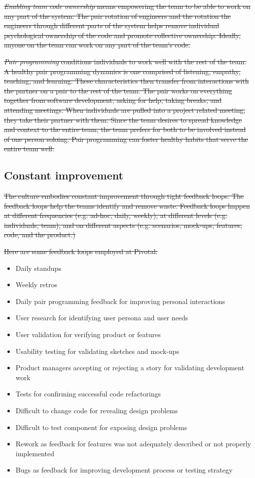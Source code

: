 \sout{\textit{Enabling team code ownership} means empowering the team to be able to work on any part of the system. The pair rotation of engineers and the rotation the engineers through different parts of the system helps remove individual psychological ownership of the code and promote collective ownership. Ideally, anyone on the team can work on any part of the team's code.}


\sout{\textit{Pair programming} conditions individuals to work well with the rest of the team. A healthy pair programming dynamics is one comprised of listening, empathy, teaching, and learning. These characteristics then transfer from interactions with the partner on a pair to the rest of the team. The pair works on everything together from software development, asking for help, taking breaks, and attending meetings. When individuals are pulled into a project related meeting, they take their partner with them. Since the team desires to spread knowledge and context to the entire team, the team prefers for both to be involved instead of one person soloing. Pair programming can foster healthy habits that serve the entire team well.}


\subsection{Constant improvement}


\sout{The culture embodies constant improvement through tight feedback loops. The feedback loops help the teams identify and remove waste. Feedback loops happen at different frequencies (e.g. ad-hoc, daily, weekly), at different levels (e.g. individuals, team), and on different aspects (e.g. scenarios, mock-ups, features, code, and the product.)}


\sout{Here are some feedback loops employed at Pivotal:}
\begin{itemize}
  \item Daily standups
  \item Weekly retros
  \item Daily pair programming feedback for improving personal interactions
  \item User research for identifying user persona and user needs
  \item User validation for verifying product or features
  \item Usability testing for validating sketches and mock-ups
  \item Product managers accepting or rejecting a story for validating development work
  \item Tests for confirming successful code refactorings 
  \item Difficult to change code for revealing design problems
  \item Difficult to test component for exposing design problems
  \item Rework as feedback for features was not adequately described or not properly implemented
  \item Bugs as feedback for improving development process or testing strategy 
\end{itemize}


